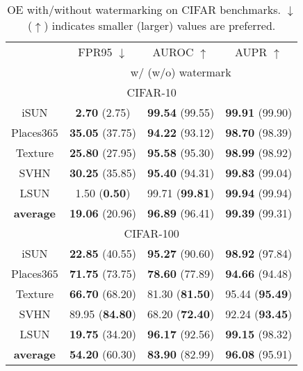 \documentclass{article}
\begin{document}
\begin{table}[t]
\parbox{.47\linewidth}{
    \centering
\caption{OE with/without watermarking  on CIFAR benchmarks. $\downarrow$ ($\uparrow$) indicates smaller (larger) values are preferred.} \label{tab: oe softmax}
\vspace{5pt}
\scriptsize
{
\begin{tabular}{c|ccc}
\toprule[1.5pt]
                   & FPR95 $\downarrow$     & AUROC $\uparrow$       & AUPR $\uparrow$      \\
                   \cline{2-4} 
\multirow{-2}{*}{} & \multicolumn{3}{c}{w/ (w/o) watermark} \\
\midrule[0.6pt]
\multicolumn{4}{c}{\cellcolor{greyL}CIFAR-10} \\
\midrule[0.6pt]
iSUN               & \textbf{2.70} (2.75) & \textbf{99.54} (99.55) & \textbf{99.91} (99.90) \\ 
Places$365$        & \textbf{35.05} (37.75) & \textbf{94.22} (93.12) & \textbf{98.70} (98.39) \\ 
Texture            & \textbf{25.80} (27.95) & \textbf{95.58} (95.30) & \textbf{98.99} (98.92) \\ 
SVHN               & \textbf{30.25} (35.85) & \textbf{95.40} (94.31) & \textbf{99.83} (99.04) \\ 
LSUN               & {1.50} (\textbf{0.50}) & {99.71} (\textbf{99.81}) & \textbf{99.94} (99.94) \\ 
\midrule
\textbf{average}   & \textbf{19.06} (20.96) & \textbf{96.89} (96.41) & \textbf{99.39} (99.31) \\  \midrule[1pt]
\multicolumn{4}{c}{\cellcolor{greyL}CIFAR-100} \\
\midrule[1pt]
iSUN               & \textbf{22.85} (40.55) & \textbf{95.27} (90.60) & \textbf{98.92} (97.84) \\ 
Places$365$        & \textbf{71.75} (73.75) & \textbf{78.60} (77.89) & \textbf{94.66} (94.48) \\ 
Texture            & \textbf{66.70} (68.20) & {81.30} (\textbf{81.50}) & {95.44} (\textbf{95.49}) \\ 
SVHN               & {89.95} (\textbf{84.80}) & {68.20} (\textbf{72.40}) & {92.24} (\textbf{93.45}) \\ 
LSUN               & \textbf{19.75} (34.20) & \textbf{96.17} (92.56) & \textbf{99.15} (98.32) \\ 
\midrule
\textbf{average}   & \textbf{54.20} (60.30) & \textbf{83.90} (82.99) & \textbf{96.08} (95.91) \\  \bottomrule[1.5pt]      

\end{tabular}}}
\end{table}
\end{document}
